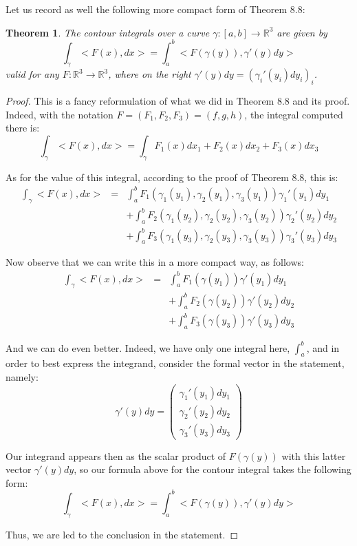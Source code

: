 \documentclass[12pt]{amsbook}
\newtheorem{theorem}{Theorem}[chapter]
\begin{document}
Let us record as well the following more compact form of Theorem 8.8:

\begin{theorem}
The contour integrals over a curve $\gamma:[a,b]\to\mathbb R^3$ are given by
$$\int_\gamma<F(x),dx>=\int_a^b<F(\gamma(y)),\gamma'(y)dy>$$
valid for any $F:\mathbb R^3\to\mathbb R^3$, where on the right $\gamma'(y)dy=(\gamma_i'(y_i)dy_i)_i$.
\end{theorem}

\begin{proof}
This is a fancy reformulation of what we did in Theorem 8.8 and its proof. Indeed, with the notation $F=(F_1,F_2,F_3)=(f,g,h)$, the integral computed there is:
$$\int_\gamma<F(x),dx>=\int_\gamma F_1(x)dx_1+F_2(x)dx_2+F_3(x)dx_3$$

As for the value of this integral, according to the proof of Theorem 8.8, this is:
\begin{eqnarray*}
\int_\gamma<F(x),dx>
&=&\int_a^bF_1(\gamma_1(y_1),\gamma_2(y_1),\gamma_3(y_1))\gamma_1'(y_1)dy_1\\
&&+\int_a^bF_2(\gamma_1(y_2),\gamma_2(y_2),\gamma_3(y_2))\gamma_2'(y_2)dy_2\\
&&+\int_a^bF_3(\gamma_1(y_3),\gamma_2(y_3),\gamma_3(y_3))\gamma_3'(y_3)dy_3
\end{eqnarray*}

Now observe that we can write this in a more compact way, as follows:
\begin{eqnarray*}
\int_\gamma<F(x),dx>
&=&\int_a^bF_1(\gamma(y_1))\gamma'(y_1)dy_1\\
&&+\int_a^bF_2(\gamma(y_2))\gamma'(y_2)dy_2\\
&&+\int_a^bF_3(\gamma(y_3))\gamma'(y_3)dy_3
\end{eqnarray*}

And we can do even better. Indeed, we have only one integral here, $\int_a^b$, and in order to best express the integrand, consider the formal vector in the statement, namely:
$$\gamma'(y)dy=\begin{pmatrix}
\gamma_1'(y_1)dy_1\\
\gamma_2'(y_2)dy_2\\
\gamma_3'(y_3)dy_3
\end{pmatrix}$$

Our integrand appears then as the scalar product of $F(\gamma(y))$ with this latter vector $\gamma'(y)dy$, so our formula above for the contour integral takes the following form:
$$\int_\gamma<F(x),dx>=\int_a^b<F(\gamma(y)),\gamma'(y)dy>$$

Thus, we are led to the conclusion in the statement. 
\end{proof}
\end{document}
